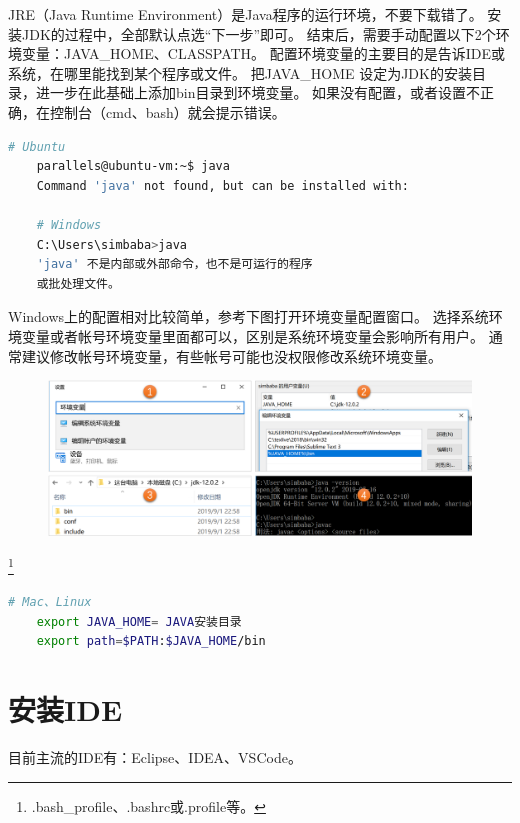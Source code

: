JRE（Java Runtime Environment）是Java程序的运行环境，不要下载错了。
安装JDK的过程中，全部默认点选“下一步”即可。
结束后，需要手动配置以下2个环境变量：JAVA\_HOME、CLASSPATH。
配置环境变量的主要目的是告诉IDE或系统，在哪里能找到某个程序或文件。
把JAVA\_HOME
设定为JDK的安装目录，进一步在此基础上添加bin目录到环境变量。
如果没有配置，或者设置不正确，在控制台（cmd、bash）就会提示错误。
\begin{lstlisting}[language=bash]
	# Ubuntu
	parallels@ubuntu-vm:~$ java
	Command 'java' not found, but can be installed with:

	# Windows
	C:\Users\simbaba>java
	'java' 不是内部或外部命令，也不是可运行的程序
	或批处理文件。
\end{lstlisting}

Windows上的配置相对比较简单，参考下图打开环境变量配置窗口。
选择系统环境变量或者帐号环境变量里面都可以，区别是系统环境变量会影响所有用户。
通常建议修改帐号环境变量，有些帐号可能也没权限修改系统环境变量。

\begin{figure}[!htb]
	\centerline{\includegraphics[scale=.5]{images/windows_java_set.png}}
\end{figure}

\footnote{.bash\_profile、.bashrc或.profile等。}
\begin{lstlisting}[language=bash]
	# Mac、Linux
	export JAVA_HOME= JAVA安装目录
	export path=$PATH:$JAVA_HOME/bin
\end{lstlisting}

\section{安装IDE}
目前主流的IDE有：Eclipse、IDEA、VSCode。